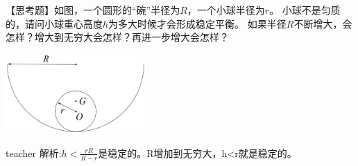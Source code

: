 \begin{example}
【思考题】如图，一个圆形的“碗”半径为$R$，一个小球半径为$r$。
小球不是匀质的，请问小球重心高度$h$为多大时候才会形成稳定平衡。
如果半径$R$不断增大，会怎样？增大到无穷大会怎样？再进一步增大会怎样？
\begin{flushright}
\includegraphics[width = 0.4\textwidth]{images/static-force-27.pdf} 
\end{flushright}
\begin{taggedblock}{teacher}
解析:$h<\frac{rR}{R-r}$是稳定的。R增加到无穷大，h<r就是稳定的。

\end{taggedblock}
\end{example}
